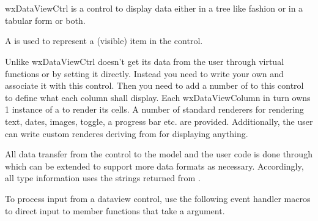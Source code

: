 
\section{}\label{wxdataviewctrl}

wxDataViewCtrl is a control to display data either
in a tree like fashion or in a tabular form or both. 

A  is used
to represent a (visible) item in the control.

Unlike  wxDataViewCtrl doesn't 
get its data from the user through virtual functions or by
setting it directly. Instead you need to write your own 
 and associate
it with this control. Then you need to add a number of
 to this control to
define what each column shall display. Each wxDataViewColumn
in turn owns 1 instance of a 
 to render its
cells. A number of standard renderers for rendering text, dates,
images, toggle, a progress bar etc. are provided. Additionally,
the user can write custom renderes deriving from 
for displaying anything.

All data transfer from the control to the model and the user
code is done through  which can
be extended to support more data formats as necessary. 
Accordingly, all type information uses the strings returned
from .


\twocolwidtha{5cm}
\begin{twocollist}\itemsep=0pt
\end{twocollist}



To process input from a dataview control, use the following event handler
macros to direct input to member functions that take a 
 argument.

\twocolwidtha{7cm}
\begin{twocollist}\itemsep=0pt


\end{twocollist}


